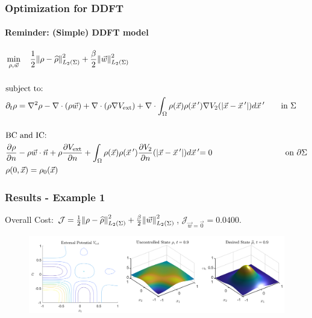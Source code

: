 \documentclass[aspectratio=169,xcolor=dvipsnames]{beamer}
\begin{document}
\begin{frame}
	\frametitle{Optimization for DDFT}
	\framesubtitle{Reminder: (Simple) DDFT model}
	\begin{align*}
		&\min_{\rho,\vec{w}} \quad \frac{1}{2}\norm{\rho- \widehat{\rho}}_{L_2(\Sigma)}^2 + \frac{\beta}{2} \norm{ {\vec{w}}}_{L_2(\Sigma)}^2\\
		\\
		&\text{subject to:}
		\\
		& \partial_t \rho = \nabla^2 \rho - \nabla \cdot (\rho  {\vec{w}}) + \nabla \cdot \left( \rho \nabla V_{\text{ext}} \right) + {\nabla \cdot \int_\Omega \rho(\vec{x}) \rho(\vec{x}\hspace{0.2em}') \nabla V_2(|\vec{x}-\vec{x}\hspace{0.2em}'|)d\vec{x}\hspace{0.2em}'} \qquad { \text{in    } \Sigma}\\
		\\
		&{\text{BC } \text{and IC:}}\\
		&\frac{\partial \rho}{\partial n} - \rho  {\vec{w}} \cdot \vec{n} + \rho \frac{\partial V_{\text{ext}}}{\partial n} + { \int_\Omega \rho(\vec{x}) \rho(\vec{x}\hspace{0.2em}')  \frac{ \partial  V_2}{\partial n}(|\vec{x}-\vec{x}\hspace{0.2em}'|)d\vec{x}\hspace{0.2em}'} {= 0 \qquad \quad \qquad \qquad \qquad \text{on   } \partial \Sigma  } \\
		&{\rho(0,\vec{x}) = \rho_0(\vec{x})} 
	\end{align*}
	
\end{frame}

\begin{frame}
	\frametitle{Results - Example 1}
	Overall Cost: $\mathcal J = \frac{1}{2}\norm{\rho- \widehat{\rho}}_{L_2(\Sigma)}^2 + \frac{\beta}{2} \norm{\vec{w}}_{L_2(\Sigma)}^2$, $\mathcal J_{\vec{w}= \vec 0} = 0.0400$.
    \vspace{0.3 cm}
	\begin{figure}
		\includegraphics[width=14.5cm]{Figure32Db.png}
	\end{figure}
	
\end{frame}
\end{document}
